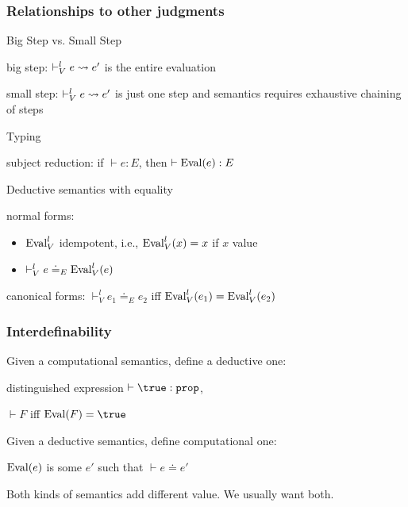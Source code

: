 \begin{frame}\frametitle{Relationships to other judgments}
\begin{blockitems}{Big Step vs. Small Step}
 \item big step: $\vdash^l_V e\rightsquigarrow e'$ is the entire evaluation
 \item small step: $\vdash^l_V e\rightsquigarrow e'$ is just one step and semantics requires exhaustive chaining of steps
\end{blockitems}

\begin{blockitems}{Typing}
 \item subject reduction: if $\vdash e:E$, then $\vdash \mathrm{Eval}(e):E$
\end{blockitems}

\begin{blockitems}{Deductive semantics with equality}
 \item normal forms:
  \begin{itemize}
  \item $\mathrm{Eval}^l_V$ idempotent, i.e., $\mathrm{Eval}^l_V(x)=x$ if $x$ value
  \item $\vdash^l_V e\doteq_E\mathrm{Eval}^l_V(e)$
  \end{itemize} 
 \item canonical forms: $\vdash^l_V e_1\doteq_E e_2$ iff $\mathrm{Eval}^l_V(e_1)=\mathrm{Eval}^l_V(e_2)$
\end{blockitems}
\end{frame}

\begin{frame}\frametitle{Interdefinability}
\begin{blockitems}{Given a computational semantics, define a deductive one:}
\item distinguished expression $\vdash \true:\prop$,
\item $\vdash F$ iff $\Eval(F)=\true$
\end{blockitems}

\begin{blockitems}{Given a deductive semantics, define computational one:}
\item $\mathrm{Eval}(e)$ is some $e'$ such that $\vdash e\doteq e'$
\end{blockitems}

Both kinds of semantics add different value. We usually want both.
\end{frame}


